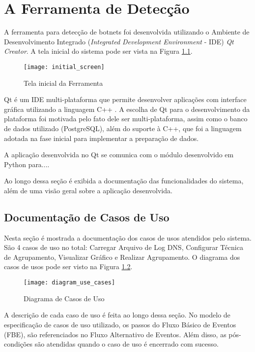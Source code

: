 \chapter{A Ferramenta de Detecção}
A ferramenta para detecção de botnets foi desenvolvida utilizando o Ambiente de Desenvolvimento Integrado (\textit{Integrated Development Environment} - IDE) \textit{Qt Creator}. A tela inicial do sistema pode ser vista na Figura \ref{fig:initial_screen}.

\begin{figure}
\centering
\texttt{[image: initial\_screen]}
\caption[Tela inicial da Ferramenta]{Tela inicial da Ferramenta} \label{fig:initial_screen}
\end{figure}

Qt é um IDE multi-plataforma que permite desenvolver aplicações com interface gráfica utilizando a linguagem C++ \citep{qtsite}. A escolha de Qt para o desenvolvimento da plataforma foi motivada pelo fato dele ser multi-plataforma, assim como o banco de dados utilizado (PostgreSQL), além do suporte à C++, que foi a linguagem adotada na fase inicial para implementar a preparação de dados.

A aplicação desenvolvida no Qt se comunica com o módulo desenvolvido em Python para....

Ao longo dessa seção é exibida a documentação das funcionalidades do sistema, além de uma visão geral sobre a aplicação desenvolvida.

\section{Documentação de Casos de Uso}
Nesta seção é mostrada a documentação dos casos de usos atendidos pelo sistema. São 4 casos de uso no total: Carregar Arquivo de Log DNS, Configurar Técnica de Agrupamento, Visualizar Gráfico e Realizar Agrupamento. O diagrama dos casos de usos pode ser visto na Figura \ref{fig:diagram_use_cases}. 

\begin{figure}
\centering
\texttt{[image: diagram\_use\_cases]}
\caption[Diagrama de Casos de Uso]{Diagrama de Casos de Uso} \label{fig:diagram_use_cases}
\end{figure}

A descrição de cada caso de uso é feita ao longo dessa seção. No modelo de especificação de casos de uso utilizado, os passos do Fluxo Básico de Eventos (FBE), são referenciados no Fluxo Alternativo de Eventos. Além disso, as pós-condições são atendidas quando o caso de uso é encerrado com sucesso.

